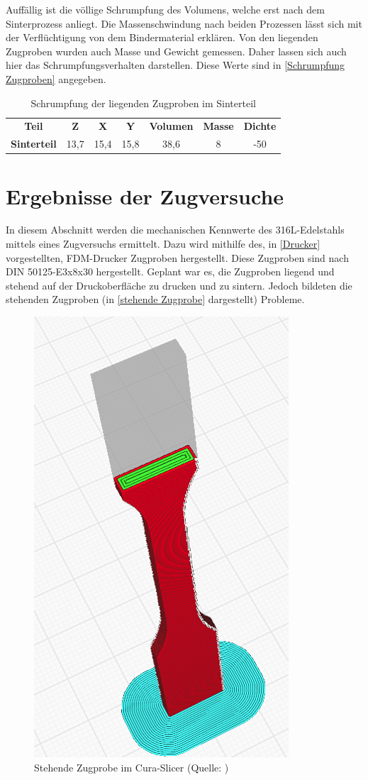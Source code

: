 Auffällig ist die völlige Schrumpfung des Volumens, welche erst nach dem Sinterprozess anliegt. Die Massenschwindung nach beiden Prozessen lässt sich mit der Verflüchtigung von dem Bindermaterial erklären. 
Von den liegenden Zugproben wurden auch Masse und Gewicht gemessen. Daher lassen sich auch hier das Schrumpfungsverhalten darstellen. Diese Werte sind in \autoref{Schrumpfung Zugproben} angegeben.


\begin{table}[h]
    \centering
    \caption{Schrumpfung der liegenden Zugproben im Sinterteil}
      \begin{tabular}{ccccccc}
      \toprule
      \textbf{Teil} & \multicolumn{1}{c}{\textbf{Z}} & \multicolumn{1}{c}{\textbf{X}} & \multicolumn{1}{c}{\textbf{Y}} & \multicolumn{1}{c}{\textbf{Volumen}} & \multicolumn{1}{c}{\textbf{Masse}} & \multicolumn{1}{c}{\textbf{Dichte}} \\
        \textbf{Sinterteil} & 13,7 & 15,4 & 15,8 & 38,6 & 8 & -50 \\
      \bottomrule
      \end{tabular}%
    \label{Schrumpfung Zugproben}%
  \end{table}%
  \FloatBarrier

\section{Ergebnisse der Zugversuche}

In diesem Abschnitt werden die mechanischen Kennwerte des 316L-Edelstahls mittels eines Zugversuchs ermittelt. Dazu wird mithilfe des, in \autoref{Drucker} vorgestellten, FDM-Drucker Zugproben hergestellt. Diese Zugproben sind nach DIN 50125-E3x8x30 hergestellt.
Geplant war es, die Zugproben liegend und stehend auf der Druckoberfläche zu drucken und zu sintern. Jedoch bildeten die stehenden Zugproben (in \autoref{stehende Zugprobe} dargestellt) Probleme.

\begin{figure}[h] 
  \centering
  \includegraphics[width=0.4\linewidth]{bilder/Screenshot 2023-11-01 171423.png}
        \caption[Stehende Zugprobe im Cura-Slicer] {Stehende Zugprobe im Cura-Slicer (Quelle: \autocite{Prusa})}
  \label{stehende Zugprobe}
\end{figure}
\FloatBarrier

